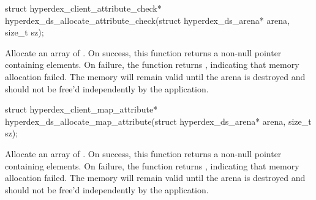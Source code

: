 \funcsep
\begin{ccode}
struct hyperdex_client_attribute_check*
hyperdex_ds_allocate_attribute_check(struct hyperdex_ds_arena* arena, size_t sz);
\end{ccode}
\funcdesc Allocate an array of .
On success, this function returns a non-null pointer containing 
elements.  On failure, the function returns , indicating that memory
allocation failed.  The memory will remain valid until the arena is destroyed
and should not be free'd independently by the application.

\funcsep
\begin{ccode}
struct hyperdex_client_map_attribute*
hyperdex_ds_allocate_map_attribute(struct hyperdex_ds_arena* arena, size_t sz);
\end{ccode}
\funcdesc Allocate an array of .
On success, this function returns a non-null pointer containing 
elements.  On failure, the function returns , indicating that memory
allocation failed.  The memory will remain valid until the arena is destroyed
and should not be free'd independently by the application.
